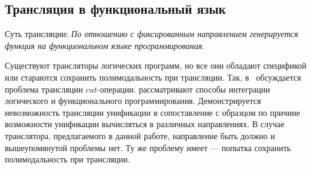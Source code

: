 \subsection{Трансляция в функциональный язык}

Суть трансляции:
\emph{По отношению с фиксированным направлением генерируется функция на функциональном языке программирования}.

Существуют трансляторы логических программ, но все они обладают спецификой \prolog{} или стараются сохранить полимодальность при трансляции.
Так, в~\cite{Matsushita1997FCO} обсуждается проблема трансляции $cut$-операции.
\cite{Bellia1986TRB} рассматривают способы интеграции логического и функционального программирования.
Демонстрируется невозможность трансляции унификации в сопоставление с образцом по причине возможности унификации вычисляться в различных направлениях.
В случае транслятора, предлагаемого в данной работе, направление быть должно и вышеупомянутой проблемы нет.
Ту же проблему имеет \cite{marchiori1995the} --- попытка сохранить полимодальность при трансляции.
